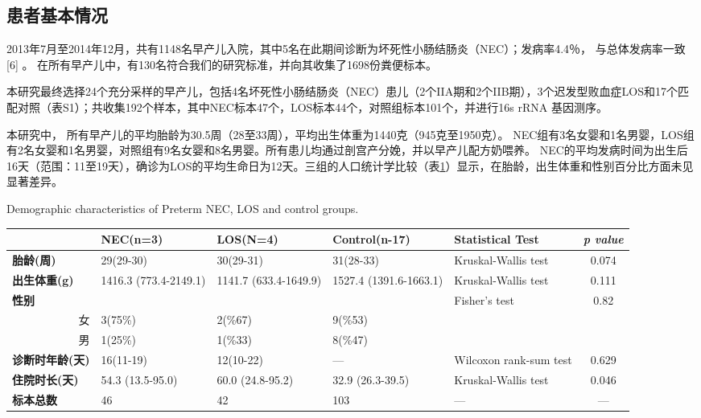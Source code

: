   \subsection{患者基本情况}
  2013年7月至2014年12月，共有1148名早产儿入院，其中5名在此期间诊断为坏死性小肠结肠炎（NEC）；发病率4.4％， 与总体发病率一致 [6] 。 在所有早产儿中，有130名符合我们的研究标准，并向其收集了1698份粪便标本。

  本研究最终选择24个充分采样的早产儿，包括4名坏死性小肠结肠炎（NEC）患儿（2个IIA期和2个IIB期），3个迟发型败血症LOS和17个匹配对照（表S1）；共收集192个样本，其中NEC标本47个，LOS标本44个，对照组标本101个，并进行16s rRNA 基因测序。

  本研究中， 所有早产儿的平均胎龄为30.5周（28至33周），平均出生体重为1440克（945克至1950克）。 NEC组有3名女婴和1名男婴，LOS组有2名女婴和1名男婴，对照组有9名女婴和8名男婴。所有患儿均通过剖宫产分娩，并以早产儿配方奶喂养。 NEC的平均发病时间为出生后16天（范围：11至19天），确诊为LOS的平均生命日为12天。三组的人口统计学比较（表\ref{tab:necdemographic}）显示，在胎龄，出生体重和性别百分比方面未见显著差异。

  \begin{table}[!hpb]
    \centering
      {Demographic characteristics of Preterm NEC, LOS and control groups.}
    \label{tab:necdemographic}
    \begin{tabular}{lp{1.8cm}p{1.8cm}p{1.8cm}p{2cm}c}
      \toprule
         & \textbf{NEC(n=3)} & \textbf{LOS(N=4)} & \textbf{Control(n-17)} & \textbf{Statistical Test} & \textit{p value} \\ \midrule
        \textbf{胎龄(周)} & 29(29-30) & 30(29-31) & 31(28-33) & Kruskal-Wallis test & 0.074 \\
        \textbf{出生体重(g)} & 1416.3 (773.4-2149.1) & 1141.7 (633.4-1649.9) & 1527.4 (1391.6-1663.1) & Kruskal-Wallis test & 0.111 \\
        \textbf{性别} &  &  &  & Fisher's test & 0.82 \\
        \multicolumn{1}{r}{女} & 3(75\%) & 2(\%67) & 9(\%53) &  & \\
        \multicolumn{1}{r}{男} & 1(25\%) & 1(\%33) & 8(\%47) &  & \\
        \textbf{诊断时年龄(天)} & 16(11-19) & 12(10-22) & — & Wilcoxon rank-sum test & 0.629 \\
        \textbf{住院时长(天)} & 54.3 (13.5-95.0) & 60.0 (24.8-95.2) & 32.9 (26.3-39.5) & Kruskal-Wallis test & 0.046 \\
        \textbf{标本总数} & 46 & 42 & 103 & — & — \\ \bottomrule
    \end{tabular}
  \end{table}

